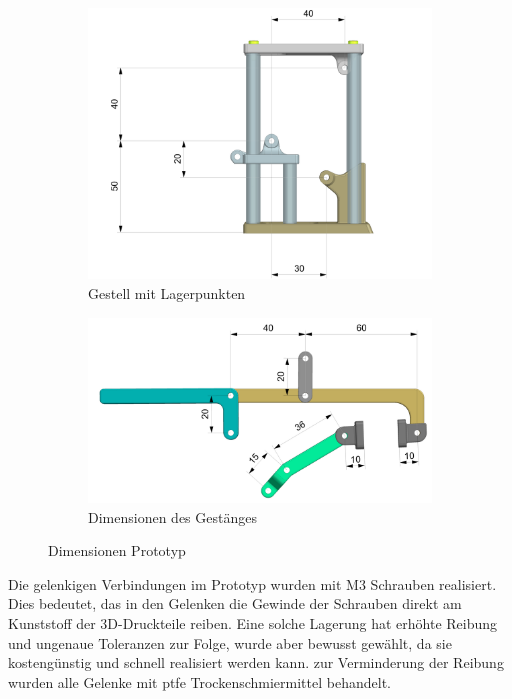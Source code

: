 \begin{figure}[H]
\centering
\begin{subfigure}{0.7\textwidth}
\centering
\includegraphics[width=\textwidth]{assets/greifer-prototyp/Greifer_Dimensionen_Lagerpunkte.png}
\caption{Gestell mit Lagerpunkten}
\label{fig:gripper-frame-mounting-points}
\end{subfigure}
\begin{subfigure}{0.7\textwidth}
\centering
\includegraphics[width=\textwidth]{assets/greifer-prototyp/Greifer_Dimensionen_Arme.png}
\caption{Dimensionen des Gestänges}
\label{fig:gripper-linkage-dimensions}
\end{subfigure}
\caption{Dimensionen Prototyp}
\label{gripper-prototype-dimensions}
\end{figure}

Die gelenkigen Verbindungen im Prototyp wurden mit M3 Schrauben realisiert. Dies bedeutet, das in den Gelenken die Gewinde der Schrauben direkt am Kunststoff der 3D-Druckteile reiben. Eine solche Lagerung hat erhöhte Reibung und ungenaue Toleranzen zur Folge, wurde aber bewusst gewählt, da sie kostengünstig und schnell realisiert werden kann. zur Verminderung der Reibung wurden alle Gelenke mit \acrfull{ptfe} Trockenschmiermittel behandelt.

